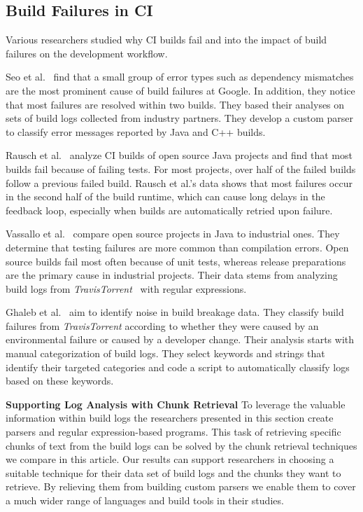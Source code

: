 \subsection{Build Failures in CI}
Various researchers studied why CI builds fail and into the impact of
build failures on the development workflow.

Seo et al.~\cite{seo2014programmers} find that a small group of error
types such as dependency mismatches are the most prominent cause of
build failures at Google.
In addition, they notice that most failures
are resolved within two builds.
They based their analyses on sets of
build logs collected from industry partners.
They develop a custom
parser to classify error messages reported by Java and C++ builds.

Rausch et al.~\cite{rausch2017empirical} analyze CI builds of open
source Java projects and find that most builds fail because of failing
tests.
For most projects, over half of the failed builds follow a
previous failed build.
Rausch et al.'s data shows that most failures
occur in the second half of the build runtime, which can cause long
delays in the feedback loop, especially when builds are automatically
retried upon failure.

Vassallo et al.~\cite{vassallo2017a-tale} compare open source projects
in Java to industrial ones.
They determine that testing failures are
more common than compilation errors.
Open source builds fail most
often because of unit tests, whereas release preparations are the
primary cause in industrial projects.
Their data stems from analyzing
build logs from \emph{TravisTorrent}~\cite{beller2017travistorrent}
with regular expressions.

Ghaleb et al.~\cite{ghaleb2019studying} aim to identify noise in build
breakage data.
They classify build failures from \emph{TravisTorrent}
according to whether they were caused by an environmental failure or
caused by a developer change.
Their analysis starts with manual
categorization of build logs.
They select keywords and strings that
identify their targeted categories and code a script to automatically
classify logs based on these keywords.

\noindent
\textbf{Supporting Log Analysis with Chunk Retrieval}
To leverage the valuable information within build logs the researchers
presented in this section create parsers and regular expression-based
programs.
This task of retrieving specific chunks of text from the
build logs can be solved by the chunk retrieval techniques we compare
in this article.
Our results can support researchers in choosing a
suitable technique for their data set of build logs and the chunks
they want to retrieve.
By relieving them from building custom parsers
we enable them to cover a much wider range of languages and build
tools in their studies.


